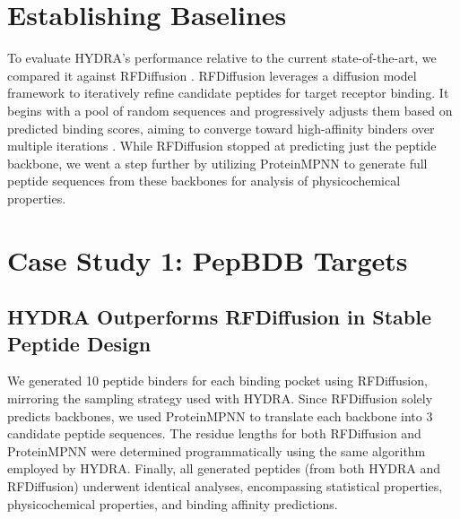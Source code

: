 \section{Establishing Baselines}
To evaluate HYDRA's performance relative to the current state-of-the-art, we compared it against RFDiffusion \cite{watson2023novo}. RFDiffusion leverages a diffusion model framework to iteratively refine candidate peptides for target receptor binding. It begins with a pool of random sequences and progressively adjusts them based on predicted binding scores, aiming to converge toward high-affinity binders over multiple iterations \cite{watson2023novo}. While RFDiffusion stopped at predicting just the peptide backbone, we went a step further by utilizing ProteinMPNN \cite{dauparas2022robust} to generate full peptide sequences from these backbones for analysis of physicochemical properties. \\

\section{Case Study 1: PepBDB Targets}
\subsection*{HYDRA Outperforms RFDiffusion in Stable Peptide Design}

We generated 10 peptide binders for each binding pocket using RFDiffusion, mirroring the sampling strategy used with HYDRA. Since RFDiffusion solely predicts backbones, we used ProteinMPNN to translate each backbone into 3 candidate peptide sequences. The residue lengths for both RFDiffusion and ProteinMPNN were determined programmatically using the same algorithm employed by HYDRA. Finally, all generated peptides (from both HYDRA and RFDiffusion) underwent identical analyses, encompassing statistical properties, physicochemical properties, and binding affinity predictions. \\

